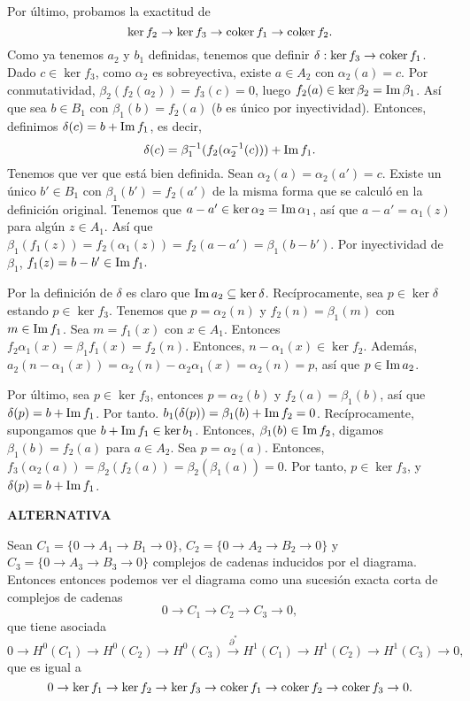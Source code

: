 \documentclass[twoside]{article}
\begin{document}
\begin{solucion}
Por último, probamos la exactitud de 
\[
\ker{f_2}\to \ker{f_3}\to \operatorname{coker}{f_1}\to \operatorname{coker}{f_2}.
\]
Como ya tenemos $a_2$ y $b_1$ definidas, tenemos que definir $\delta:\ker{f_3}\to\operatorname{coker}{f_1}$. Dado $c\in\ker{f_3}$, como $\alpha_2$ es sobreyectiva, existe $a\in A_2$ con $\alpha_2(a)=c$. Por conmutatividad, $\beta_2(f_2(a_2))=f_3(c)=0$, luego $f_2(a)\in\ker{\beta_2}=\operatorname{Im}{\beta_1}$. Así que sea $b\in B_1$ con $\beta_1(b)=f_2(a)$ ($b$ es único por inyectividad). Entonces, definimos $\delta(c)=b+\operatorname{Im}{f_1}$, es decir, $$\delta(c)=\beta_1^{-1}(f_2(\alpha_2^{-1}(c)))+\operatorname{Im}{f_1}.$$ Tenemos que ver que está bien definida. Sean $\alpha_2(a)=\alpha_2(a')=c$. Existe un único $b'\in B_1$ con $\beta_1(b')=f_2(a')$ de la misma forma que se calculó en la definición original. Tenemos que $a-a'\in\ker{\alpha_2}=\operatorname{Im}{\alpha_1}$, así que $a-a'=\alpha_1(z)$ para algún $z\in A_1$. Así que $\beta_1(f_1(z))=f_2(\alpha_1(z))=f_2(a-a')=\beta_1(b-b')$. Por inyectividad de $\beta_1$, $f_1(z)=b-b'\in\operatorname{Im}{f_1}.$

Por la definición de $\delta$ es claro que $\operatorname{Im}{a_2}\subseteq\ker{\delta}$. Recíprocamente, sea $p\in\ker{\delta}$ estando $p\in\ker{f_3}$. Tenemos que $p=\alpha_2(n)$ y $f_2(n)=\beta_1(m)$ con $m\in\operatorname{Im}{f_1}$. Sea $m=f_1(x)$ con $x\in A_1$. Entonces $f_2\alpha_1(x)=\beta_1 f_1(x)=f_2(n)$.  Entonces, $n-\alpha_1(x)\in\ker{f_2}$. Además, $a_2(n-\alpha_1(x))=\alpha_2(n)-\alpha_2\alpha_1(x)=\alpha_2(n)=p$, así que $p\in\operatorname{Im}{a_2}$.

Por último, sea $p\in\ker{f_3}$, entonces $p=\alpha_2(b)$ y $f_2(a)=\beta_1(b)$, así que $\delta(p)=b+\operatorname{Im}{f_1}$. Por tanto. $b_1(\delta(p))=\beta_1(b)+\operatorname{Im}{f_2}=0$. Recíprocamente, supongamos que $b+\operatorname{Im}{f_1}\in\ker{b_1}$. Entonces, $\beta_1(b)\in\operatorname{Im}{f_2}$, digamos $\beta_1(b)=f_2(a)$ para $a\in A_2$. Sea $p=\alpha_2(a)$. Entonces, $f_3(\alpha_2(a))=\beta_2(f_2(a))=\beta_2(\beta_1(a))=0$. Por tanto, $p\in\ker{f_3}$, y $\delta(p)=b+\operatorname{Im}{f_1}$.

\vspace{0.5cm}

{\bf\large ALTERNATIVA}

Sean $C_1=\{0\to A_1\to B_1\to 0\}$, $C_2=\{0\to A_2\to B_2\to 0\}$ y $C_3=\{0\to A_3\to B_3\to 0\}$ complejos de cadenas inducidos por el diagrama. Entonces entonces podemos ver el diagrama como una sucesión exacta corta de complejos de cadenas
\[
0\to C_1\to C_2\to C_3\to 0,
\]
que tiene asociada
\[
0\to H^0(C_1)\to H^0(C_2)\to H^0(C_3)\overset{\partial^*}{\to} H^1(C_1)\to H^1(C_2)\to H^1(C_3)\to 0,
\]
que es igual a 
\[
0\to \ker{f_1} \to\ker{f_2} \to \ker{f_3}\to\operatorname{coker}{f_1}\to\operatorname{coker}{f_2}\to\operatorname{coker}{f_3}\to 0.
\]


\end{solucion}
\newpage
\end{document}

